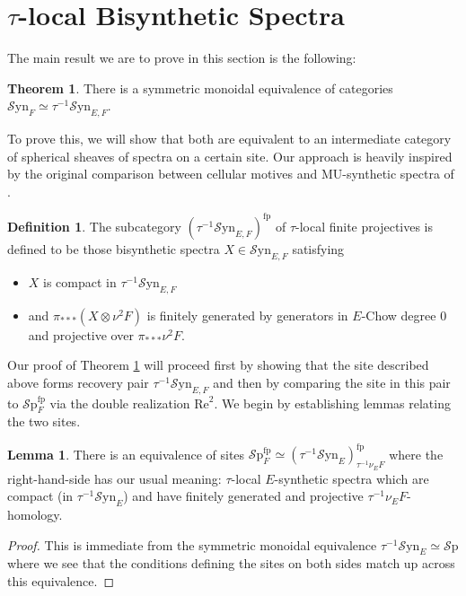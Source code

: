 \documentclass[10pt]{amsart}
\theoremstyle{definition}
\numberwithin{figure}{section}
\numberwithin{equation}{section}
\newtheorem{theorem}[figure]{Theorem}
\newtheorem{lemma}[figure]{Lemma}
\newtheorem{definition}[figure]{Definition}
\newcommand{\MU}{\mathrm{MU}}
\theoremstyle{cited}
\newcommand{\Sp}{{\mathcal{S}\mathrm{p}}}
\newcommand{\fp}{\mathrm{fp}}
\newcommand{\Syn}{\mathcal{S}\mathrm{yn}}
\renewcommand{\Re}{\mathrm{Re}}
\begin{document}
\section{$\tau$-local Bisynthetic Spectra}

The main result we are to prove in this section is the following:

\begin{theorem}
  \label{thm:taulocal}
  There is a symmetric monoidal equivalence of categories $\Syn_F\simeq \tau^{-1}\Syn_{E,F}$.
\end{theorem}

To prove this, we will show that both are equivalent to an intermediate category of spherical sheaves of spectra on a certain site. Our approach is heavily inspired by the original comparison between cellular motives and $\MU$-synthetic spectra of \cite{Pst22}.

\begin{definition}
  The subcategory $(\tau^{-1}\Syn_{E,F})^\fp$ of $\tau$-local finite projectives is defined to be those bisynthetic spectra $X\in \Syn_{E,F}$ satisfying
  \begin{itemize}
    \item $X$ is compact in $\tau^{-1}\Syn_{E,F}$
    \item and $\pi_{***}(X\otimes \nu^2F)$ is finitely generated by generators in $E$-Chow degree $0$ and projective over $\pi_{***}\nu^2F$. 
  \end{itemize}
\end{definition}

Our proof of Theorem \ref{thm:taulocal} will proceed first by showing that the site described above forms recovery pair $\tau^{-1}\Syn_{E,F}$ and then by comparing the site in this pair to $\Sp_F^\fp$ via the double realization $\Re^2$. We begin by establishing lemmas relating the two sites.

\begin{lemma}
  There is an equivalence of sites $\Sp_F^\fp\simeq (\tau^{-1}\Syn_E)^{\fp}_{\tau^{-1}\nu_E F}$ where the right-hand-side has our usual meaning: $\tau$-local $E$-synthetic spectra which are compact (in $\tau^{-1}\Syn_E$) and have finitely generated and projective $\tau^{-1}\nu_EF$-homology.
\end{lemma}

\begin{proof}
  This is immediate from the symmetric monoidal equivalence $\tau^{-1}\Syn_{E}\simeq \Sp$ where we see that the conditions defining the sites on both sides match up across this equivalence.
\end{proof}
\end{document}

